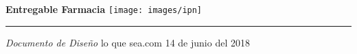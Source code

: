 \documentclass[12pt]{book}
\begin{document}
\begin{titlepage}
  \vspace*{4cm}
  {\fontsize{28}{34}\selectfont\bfseries Entregable Farmacia}
  \hfill
  \texttt{[image: images/ipn]} \\
  {
  \color{gris}\hrule}
  \Large{\itshape Documento de Diseño}
  \vfill
  {\large lo que sea.com \hfill 14 de junio del 2018}
\end{titlepage}









\end{document}
